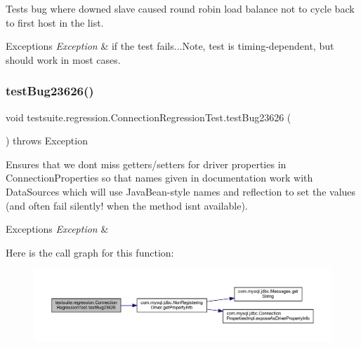 Tests bug where downed slave caused round robin load balance not to cycle back to first host in the list.


\begin{DoxyExceptions}{Exceptions}
{\em Exception} & if the test fails...Note, test is timing-\/dependent, but should work in most cases. \\
\hline
\end{DoxyExceptions}
\mbox{\label{classtestsuite_1_1regression_1_1_connection_regression_test_a0fda786f7ab6f9338c7dd469a8e617fa}} 
\subsubsection{\texorpdfstring{test\+Bug23626()}{testBug23626()}}
{\footnotesize\ttfamily void testsuite.\+regression.\+Connection\+Regression\+Test.\+test\+Bug23626 (\begin{DoxyParamCaption}{ }\end{DoxyParamCaption}) throws Exception}

Ensures that we don\textquotesingle{}t miss getters/setters for driver properties in Connection\+Properties so that names given in documentation work with Data\+Sources which will use Java\+Bean-\/style names and reflection to set the values (and often fail silently! when the method isn\textquotesingle{}t available).


\begin{DoxyExceptions}{Exceptions}
{\em Exception} & \\
\hline
\end{DoxyExceptions}
Here is the call graph for this function\+:
\nopagebreak
\begin{figure}[H]
\begin{center}
\leavevmode
\includegraphics[width=350pt]{classtestsuite_1_1regression_1_1_connection_regression_test_a0fda786f7ab6f9338c7dd469a8e617fa_cgraph}
\end{center}
\end{figure}
\mbox{\label{classtestsuite_1_1regression_1_1_connection_regression_test_a8b623f119364af8388c15700cc8751be}} 
